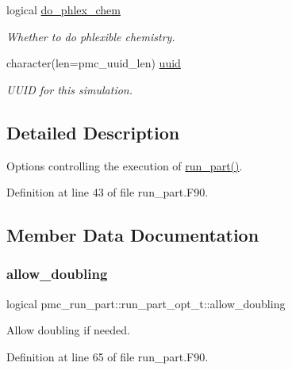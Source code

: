 \begin{DoxyCompactItemize}
logical \mbox{\hyperlink{structpmc__run__part_1_1run__part__opt__t_a17bf037f6fe4c3168e79d65275d42eae}{do\+\_\+phlex\+\_\+chem}}
\begin{DoxyCompactList}\small\item\em Whether to do phlexible chemistry. \end{DoxyCompactList}\item 
character(len=pmc\+\_\+uuid\+\_\+len) \mbox{\hyperlink{structpmc__run__part_1_1run__part__opt__t_aba087fadb801931fcf3ae9d277f22295}{uuid}}
\begin{DoxyCompactList}\small\item\em U\+U\+ID for this simulation. \end{DoxyCompactList}\end{DoxyCompactItemize}


\subsection{Detailed Description}
Options controlling the execution of \mbox{\hyperlink{namespacepmc__run__part_af2f5c765b1f86663d85b7ca882325eca}{run\+\_\+part()}}. 

Definition at line 43 of file run\+\_\+part.\+F90.



\subsection{Member Data Documentation}
\mbox{\label{structpmc__run__part_1_1run__part__opt__t_a7ed053ed123c4dae999f860c964ec8b7}} 
\subsubsection{\texorpdfstring{allow\+\_\+doubling}{allow\_doubling}}
{\footnotesize\ttfamily logical pmc\+\_\+run\+\_\+part\+::run\+\_\+part\+\_\+opt\+\_\+t\+::allow\+\_\+doubling}



Allow doubling if needed. 



Definition at line 65 of file run\+\_\+part.\+F90.

